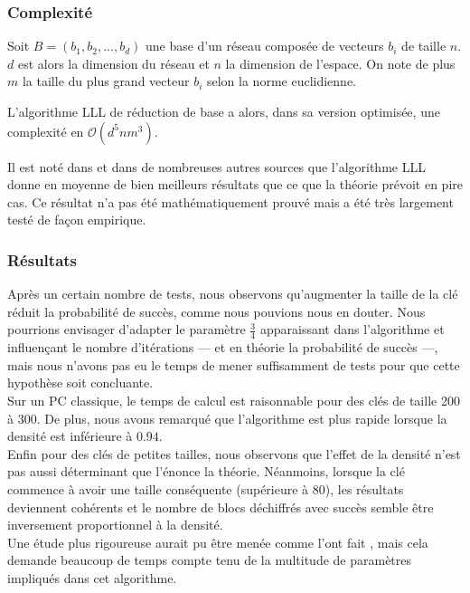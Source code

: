 \subsubsection{Complexité}
Soit $B=(b_1, b_2, ..., b_d)$ une base d'un réseau composée de vecteurs $b_i$ de taille $n$. $d$ est alors la dimension du réseau et $n$ la dimension de l'espace. On note de plus $m$ la taille du plus grand vecteur $b_i$ selon la norme euclidienne.

L'algorithme LLL de réduction de base a alors, dans sa version optimisée, une complexité en $\mathcal{O}(d^5nm^3)$.

Il est noté dans \cite{COSTER} et dans de nombreuses autres sources que l'algorithme LLL donne en moyenne de bien meilleurs résultats que ce que la théorie prévoit en pire cas. Ce résultat n'a pas été mathématiquement prouvé mais a été très largement testé de façon empirique.


\subsubsection{Résultats}

Après un certain nombre de tests, nous observons qu'augmenter la taille de la clé réduit la probabilité de succès, comme nous pouvions nous en douter. Nous pourrions envisager d'adapter le paramètre $\frac{3}{4}$ apparaissant dans l'algorithme et influençant le nombre d'itérations — et en théorie la probabilité de succès —, mais nous n'avons pas eu le temps de mener suffisamment de tests pour que cette hypothèse soit concluante.
\\

Sur un PC classique, le temps de calcul est raisonnable pour des clés de taille 200 à 300. De plus, nous avons remarqué que l'algorithme est plus rapide lorsque la densité est inférieure à $0.94$. 
\\

Enfin pour des clés de petites tailles, nous observons que l'effet de la densité n'est pas aussi déterminant que l'énonce la théorie. Néanmoins, lorsque la clé commence à avoir une taille conséquente (supérieure à 80), les résultats deviennent cohérents et le nombre de blocs déchiffrés avec succès semble être inversement proportionnel à la densité.
\\

Une étude plus rigoureuse aurait pu être menée comme l'ont fait \cite{DEROFF}, mais cela demande beaucoup de temps compte tenu de la multitude de paramètres impliqués dans cet algorithme.